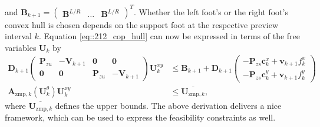 and $\bm{B}_{k+1}=\begin{pmatrix} \bm{B}^{L/R} & \dots & \bm{B}^{L/R}\end{pmatrix}^T$. Whether the left foot's or the right foot's convex hull is chosen depends on the support foot at the respective preview interval $k$. Equation \ref{eq::212_cop_hull} can now be expressed in terms of the free variables $\bm{U}_k$ by
\begin{align}
	\bm{D}_{k+1}\begin{pmatrix}
		\bm{P}_{zu} & -\bm{V}_{k+1} & \bm{0} & \bm{0}\\
		\bm{0} & \bm{0} & \bm{P}_{zu} & -\bm{V}_{k+1}
	\end{pmatrix}\bm{U}_k^{xy} &\leq \bm{B}_{k+1} + \bm{D}_{k+1}\begin{pmatrix}
		-\bm{P}_{zs}\bm{c}_k^x + \bm{v}_{k+1}f_k^x\\
		-\bm{P}_{zs}\bm{c}_k^y + \bm{v}_{k+1}f_k^y
	\end{pmatrix} \\
	\bm{A}_{\text{zmp},k}(\bm{U}_k^\theta)\bm{U}_k^{xy} &\leq \overline{\bm{U}_{\text{zmp},k}},
	\label{eq::212_ineq_zmp}
\end{align}
where $\overline{\bm{U}_{\text{zmp},k}}$ defines the upper bounds. The above derivation delivers a nice framework, which can be used to express the feasibility constraints as well.
